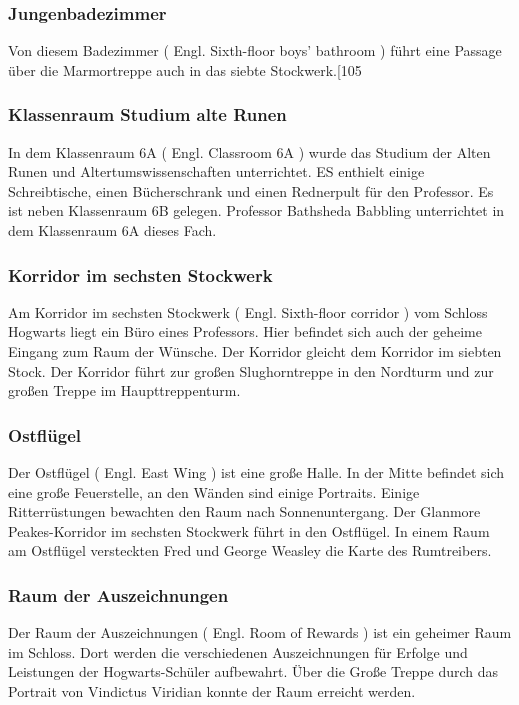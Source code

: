 \documentclass[a4paper, 10pt]{article}
\begin{document}
\subsubsection*{\large Jungenbadezimmer}
Von diesem Badezimmer (  Engl.  Sixth-floor boys' bathroom ) führt eine Passage über die Marmortreppe auch in das siebte Stockwerk.[105
\subsubsection*{\large Klassenraum Studium alte Runen}
In dem Klassenraum 6A (  Engl.  Classroom 6A ) wurde das Studium der Alten Runen und Altertumswissenschaften unterrichtet. ES enthielt einige Schreibtische, einen Bücherschrank und einen Rednerpult für den Professor. Es ist neben Klassenraum 6B gelegen. Professor Bathsheda Babbling unterrichtet in dem Klassenraum 6A dieses Fach.
\subsubsection*{\large Korridor im sechsten Stockwerk}
Am Korridor im sechsten Stockwerk (  Engl.  Sixth-floor corridor ) vom Schloss Hogwarts liegt ein Büro eines Professors. Hier befindet sich auch der geheime Eingang zum Raum der Wünsche. Der Korridor gleicht dem Korridor im siebten Stock.
\vspace{10pt}
\newline
{}  
Der Korridor führt zur großen Slughorntreppe in den Nordturm und zur großen Treppe im Haupttreppenturm.
\subsubsection*{\large Ostflügel}
Der Ostflügel (  Engl.  East Wing ) ist eine große Halle. In der Mitte befindet sich eine große Feuerstelle, an den Wänden sind einige Portraits. Einige Ritterrüstungen bewachten den Raum nach Sonnenuntergang. Der Glanmore Peakes-Korridor im sechsten Stockwerk führt in den Ostflügel. In einem Raum am Ostflügel versteckten Fred und George Weasley die Karte des Rumtreibers.
\subsubsection*{\large Raum der Auszeichnungen}
Der Raum der Auszeichnungen (  Engl.  Room of Rewards ) ist ein geheimer Raum im Schloss. Dort werden die verschiedenen Auszeichnungen für Erfolge und Leistungen der Hogwarts-Schüler aufbewahrt. Über die Große Treppe durch das Portrait von Vindictus Viridian konnte der Raum erreicht werden.
\end{document}
